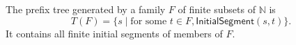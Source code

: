 \begin{definition}
The prefix tree generated by a family $F$ of finite subsets of $\mathbb N$ is
\[
T(F)=\{s\mid \text{for some }t\in F,
                 \mathsf{InitialSegment}(s,t)\}.
\]
It contains all finite initial segments of members of $F$.
\end{definition}
